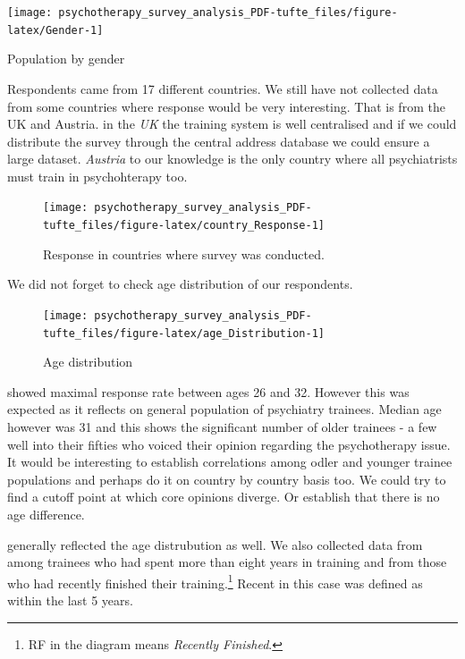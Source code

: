 \documentclass[]{tufte-handout}
\begin{document}
\begin{marginfigure}
\texttt{[image: psychotherapy\_survey\_analysis\_PDF-tufte\_files/figure-latex/Gender-1]} \caption[Population by gender]{Population by gender}\label{fig:Gender}
\end{marginfigure}

\raggedright
Respondents came from 17 different countries. We still have not
collected data from some countries where response would be very
interesting. That is from the UK and Austria. in the \emph{UK} the
training system is well centralised and if we could distribute the
survey through the central address database we could ensure a large
dataset. \emph{Austria} to our knowledge is the only country where all
psychiatrists must train in psychohterapy too.

\begin{figure}
\texttt{[image: psychotherapy\_survey\_analysis\_PDF-tufte\_files/figure-latex/country\_Response-1]} \caption[Response in countries where survey was conducted]{Response in countries where survey was conducted.}\label{fig:country_Response}
\end{figure}


We did not forget to check age distribution of our respondents.

\begin{figure}
\texttt{[image: psychotherapy\_survey\_analysis\_PDF-tufte\_files/figure-latex/age\_Distribution-1]} \caption[Age distribution]{Age distribution}\label{fig:age_Distribution}
\end{figure}

 showed maximal response rate
between ages 26 and 32. However this was expected as it reflects on
general population of psychiatry trainees. Median age however was 31 and
this shows the significant number of older trainees - a few well into
their fifties who voiced their opinion regarding the psychotherapy
issue. It would be interesting to establish correlations among odler and
younger trainee populations and perhaps do it on country by country
basis too. We could try to find a cutoff point at which core opinions
diverge. Or establish that there is no age difference.

 generally reflected the age distrubution
as well. We also collected data from among trainees who had spent more
than eight years in training and from those who had recently finished
their training.\footnote{RF in the diagram means \emph{Recently
  Finished}.} Recent in this case was defined as within the last 5
years.
\end{document}

